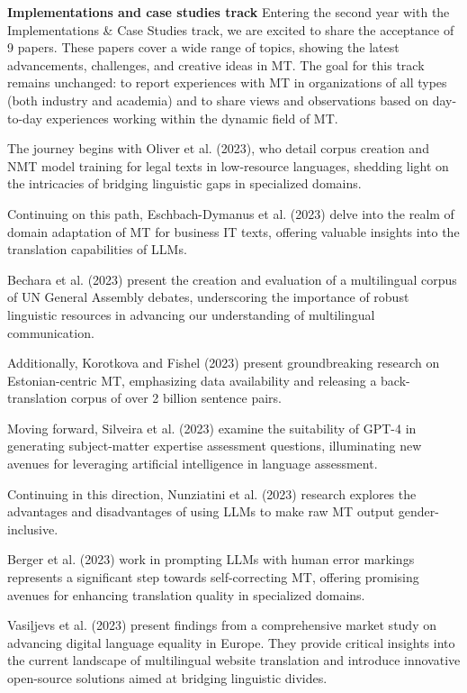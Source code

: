 {\bf Implementations and case studies track}
Entering the second year with the Implementations \& Case Studies track, we are excited to share the acceptance of 9 papers. These papers cover a wide range of topics, showing the latest advancements, challenges, and creative ideas in MT. The goal for this track remains unchanged: to report experiences with MT in organizations of all types (both industry and academia) and to share views and observations based on day-to-day experiences working within the dynamic field of MT.

The journey begins with Oliver et al. (2023), who detail corpus creation and NMT model training for legal texts in low-resource languages, shedding light on the intricacies of bridging linguistic gaps in specialized domains.

Continuing on this path, Eschbach-Dymanus et al. (2023) delve into the realm of domain adaptation of MT for business IT texts, offering valuable insights into the translation capabilities of LLMs.

Bechara et al. (2023) present the creation and evaluation of a multilingual corpus of UN General Assembly debates, underscoring the importance of robust linguistic resources in advancing our understanding of multilingual communication.

Additionally, Korotkova and Fishel (2023) present groundbreaking research on Estonian-centric MT, emphasizing data availability and releasing a back-translation corpus of over 2 billion sentence pairs.

Moving forward, Silveira et al. (2023) examine the suitability of GPT-4 in generating subject-matter expertise assessment questions, illuminating new avenues for leveraging artificial intelligence in language assessment.

Continuing in this direction, Nunziatini et al. (2023) research explores the advantages and disadvantages of using LLMs to make raw MT output gender-inclusive.

Berger et al. (2023) work in prompting LLMs with human error markings represents a significant step towards self-correcting MT, offering promising avenues for enhancing translation quality in specialized domains.

Vasiļjevs et al. (2023) present findings from a comprehensive market study on advancing digital language equality in Europe. They provide critical insights into the current landscape of multilingual website translation and introduce innovative open-source solutions aimed at bridging linguistic divides.

